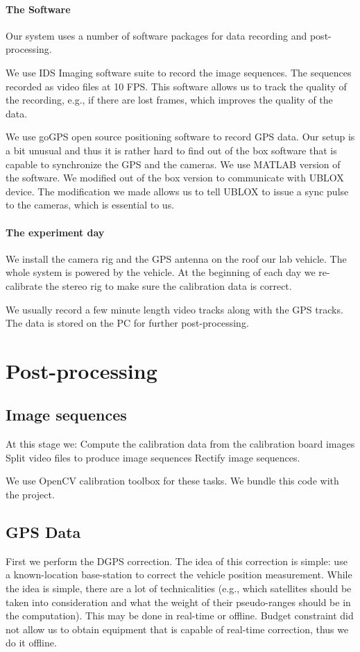 \documentclass{report}
\begin{document}
\paragraph{The Software} Our system uses a number of software packages
for data recording and post-processing.

We use IDS Imaging software suite to record the image sequences.  The
sequences recorded as video files at 10 FPS.  This software allows us
to track the quality of the recording, e.g., if there are lost frames,
which improves the quality of the data.

We use goGPS open source positioning software to record GPS data.  Our
setup is a bit unusual and thus it is rather hard to find out of the
box software that is capable to synchronize the GPS and the cameras.
We use MATLAB version of the software. We modified out of the box
version to communicate with UBLOX device.  The modification we made
allows us to tell UBLOX to issue a sync pulse to the cameras, which is
essential to us.

\paragraph{The experiment day} We install the camera rig and the GPS
antenna on the roof our lab vehicle.  The whole system is powered by
the vehicle.  At the beginning of each day we re-calibrate the stereo
rig to make sure the calibration data is correct.

We usually record a few minute length video tracks along with the GPS
tracks.  The data is stored on the PC for further post-processing.

\section{Post-processing}
\subsection{Image sequences}
At this stage we: Compute the calibration data from the calibration
board images Split video files to produce image sequences Rectify
image sequences.

We use OpenCV calibration toolbox for these tasks.  We bundle this
code with the project.

\subsection{GPS Data} First we perform the DGPS correction.  The idea
of this correction is simple: use a known-location base-station to
correct the vehicle position measurement.  While the idea is simple,
there are a lot of technicalities (e.g., which satellites should be
taken into consideration and what the weight of their pseudo-ranges
should be in the computation).  This may be done in real-time or
offline.  Budget constraint did not allow us to obtain equipment that
is capable of real-time correction, thus we do it offline.
\end{document}
